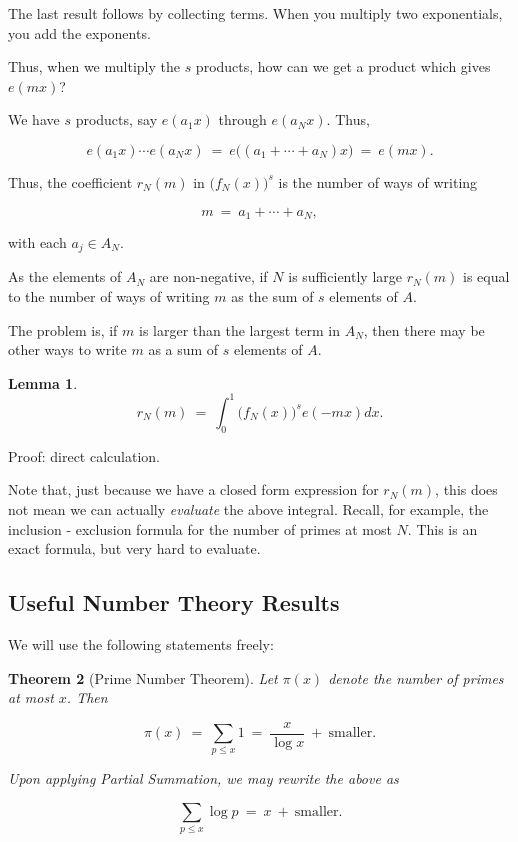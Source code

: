 \documentclass[12pt,letterpaper]{report}
\newcommand\be{\begin{equation}}
\newcommand\ee{\end{equation}}
\newtheorem{thm}{Theorem}[section]
\newtheorem{lem}[thm]{Lemma}
\begin{document}
The last result follows by collecting terms. When you multiply two
exponentials, you add the exponents.

Thus, when we multiply the $s$ products, how can we get a product
which gives $e(mx)$?

We have $s$ products, say $e(a_1x)$ through $e(a_Nx)$. Thus,

\be e(a_1x) \cdots e(a_Nx) \ = \ e\Big( (a_1 + \cdots + a_N)x\Big)
\ = \ e(mx). \ee

Thus, the coefficient $r_N(m)$ in $\Big(f_N(x)\Big)^s$ is the
number of ways of writing

\be m \ = \ a_1 + \cdots + a_N, \ee

with each $a_j \in A_N$.

As the elements of $A_N$ are non-negative, if $N$ is sufficiently
large $r_N(m)$ is equal to the number of ways of writing $m$ as
the sum of $s$ elements of $A$.

The problem is, if $m$ is larger than the largest term in $A_N$,
then there may be other ways to write $m$ as a sum of $s$ elements
of $A$.

\begin{lem}
\be r_N(m) \ = \ \int_0^1 \Big(f_N(x)\Big)^s e(-mx)dx. \ee
\end{lem}

Proof: direct calculation.

Note that, just because we have a closed form expression for
$r_N(m)$, this does not mean we can actually \emph{evaluate} the
above integral. Recall, for example, the inclusion - exclusion
formula for the number of primes at most $N$. This is an exact
formula, but very hard to evaluate.

\subsection{Useful Number Theory Results}

We will use the following statements freely:

\begin{thm}[Prime Number Theorem] Let $\pi(x)$ denote the number
of primes at most $x$. Then

\be \pi(x) \ = \ \sum_{p \le x} 1 \ = \  \frac{x}{\log x} \ + \
\text{smaller}. \ee

Upon applying Partial Summation, we may rewrite the above as

\be \sum_{p \le x} \log p \ = \ x \ + \ \text{smaller}. \ee

\end{thm}
\end{document}
